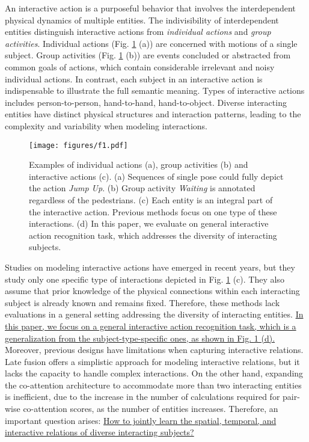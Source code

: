 \documentclass[letterpaper, 10 pt, conference]{ieeeconf}
\begin{document}
An interactive action is a purposeful behavior that involves the interdependent physical dynamics of multiple entities. The indivisibility of interdependent entities distinguish interactive actions from \textit{individual actions} and \textit{group activities}. Individual actions (Fig. \ref{InteractiveActons} (a)) are concerned with motions of a single subject. Group activities (Fig. \ref{InteractiveActons} (b)) are events concluded or abstracted from common goals of actions, which contain considerable irrelevant and noisy individual actions. In contrast, each subject in an interactive action is indispensable to illustrate the full semantic meaning. Types of interactive actions includes person-to-person, hand-to-hand, hand-to-object. Diverse interacting entities have distinct physical structures and interaction patterns, leading to the complexity and variability when modeling interactions. 

\begin{figure}[t]
    \begin{center}
    \texttt{[image: figures/f1.pdf]}
    \end{center}
    \vspace{-1.2em}
    \caption{Examples of individual actions (a)\cite{NTU120}, group activities (b)\cite{cad2009} and interactive actions (c)\cite{NTU120,8299578,H2O_TA-GCN2021}. (a) Sequences of single pose could fully depict the action \textit{Jump Up}. (b) Group activity \textit{Waiting} is annotated regardless of the pedestrians. (c) Each entity is an integral part of the interactive action. Previous methods focus on one type of these interactions. (d) In this paper, we evaluate on general interactive action recognition task, which addresses the diversity of interacting subjects.}
    \label{InteractiveActons}
    \vspace{-1.7em}
\end{figure}

Studies on modeling interactive actions have emerged in recent years\cite{H+O2019, H2O_TA-GCN2021, LSTM-IRN2022, igformer2022}, but they study only one specific type of interactions depicted in Fig. \ref{InteractiveActons} (c). They also assume that prior knowledge of the physical connections within each interacting subject is already known and remains fixed. Therefore, these methods lack evaluations in a general setting addressing the diversity of interacting entities. \uline{In this paper, we focus on a general interactive action recognition task, which is a generalization from the subject-type-specific ones, as shown in Fig. \ref{InteractiveActons} (d).} Moreover, previous designs have limitations when capturing interactive relations. Late fusion offers a simplistic approach for modeling interactive relations, but it lacks the capacity to handle complex interactions. On the other hand, expanding the co-attention architecture to accommodate more than two interacting entities is inefficient, due to the increase in the number of calculations required for pair-wise co-attention scores, as the number of entities increases. Therefore, an important question arises: \uline{How to jointly learn the spatial, temporal, and interactive relations of diverse interacting subjects?}
\end{document}
